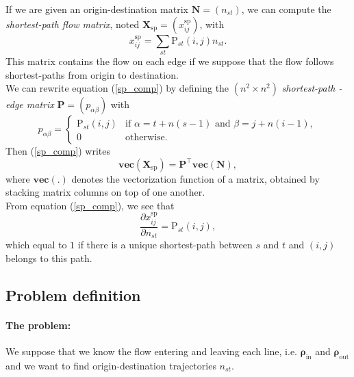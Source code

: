 \documentclass[11p]{article}
\begin{document}
If we are given an origin-destination matrix $\mathbf{N} = (n_{st})$, we can compute the \emph{shortest-path flow matrix}, noted $\mathbf{X}_\text{sp} = (x^\text{sp}_{ij})$, with
\begin{equation}
x^\text{sp}_{ij} = \sum_{st} \text{P}_{st}(i, j) n_{st} \label{sp_comp}.
\end{equation}
This matrix contains the flow on each edge if we suppose that the flow follows shortest-paths from origin to destination. \\

We can rewrite equation (\ref{sp_comp}) by defining the $(n^2 \times n^2)$ \emph{shortest-path - edge matrix} $\mathbf{P} = (p_{\alpha \beta})$ with
\begin{equation}
p_{\alpha \beta} = \begin{cases}
\text{P}_{st}(i, j) & \text{if } \alpha = t + n(s - 1) \text{ and }  \beta = j + n(i - 1), \\
0 & \text{otherwise}.
\end{cases}
\end{equation}
Then (\ref{sp_comp}) writes
\begin{equation}
\textbf{vec}(\mathbf{X}_\text{sp}) = \mathbf{P}^\top \textbf{vec}(\mathbf{N}),
\end{equation}
where $\textbf{vec}(.)$ denotes the vectorization function of a matrix, obtained by stacking matrix columns on top of one another. \\

From equation (\ref{sp_comp}), we see that 
\begin{equation}
\frac{\partial x^\text{sp}_{ij}}{\partial n_{st}} = \text{P}_{st}(i, j),
\end{equation}
which equal to $1$ if there is a unique shortest-path between $s$ and $t$ and $(i,j)$ belongs to this path.

\subsection{Problem definition}

\paragraph{The problem:} We suppose that we know the flow entering and leaving each line, i.e. $\bm{\rho}_\text{in}$ and $\bm{\rho}_\text{out}$ and we want to find origin-destination trajectories $n_{st}$. \\
\end{document}
